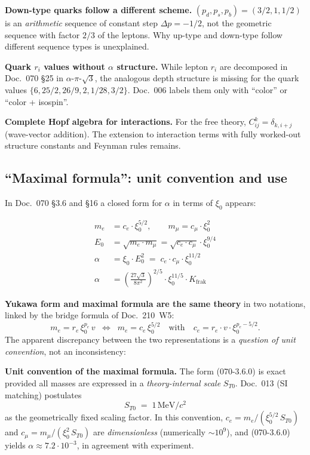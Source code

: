 \textbf{Down-type quarks follow a different scheme.}
$(p_d, p_s, p_b) = (3/2, 1, 1/2)$ is an \emph{arithmetic} sequence
of constant step $\Delta p = -1/2$, not the geometric sequence with
factor $2/3$ of the leptons. Why up-type and down-type follow
different sequence types is unexplained.

\textbf{Quark $r_i$ values without $\alpha$ structure.}
While lepton $r_i$ are decomposed in Doc.~070 §25 in
$\alpha$-$\pi$-$\sqrt{3}$, the analogous depth structure is missing
for the quark values $\{6, 25/2, 26/9, 2, 1/28, 3/2\}$. Doc.~006
labels them only with \enquote{color} or \enquote{color + isospin}.

\textbf{Complete Hopf algebra for interactions.}
For the free theory, $C^k_{ij} = \delta_{k,i+j}$ (wave-vector
addition). The extension to interaction terms with fully worked-out
structure constants and Feynman rules remains.

\subsection{\enquote{Maximal formula}: unit convention and use}
\label{subsec:warning-maximal-formula}

In Doc.~070 §3.6 and §16 a closed form for $\alpha$ in terms of $\xi_0$
appears:

\begin{align}
  m_e &= c_e \cdot \xi_0^{5/2}, \qquad m_\mu = c_\mu \cdot \xi_0^{2}
  \tag*{(070-4.2)}\\
  E_0 &= \sqrt{m_e \cdot m_\mu} = \sqrt{c_e \cdot c_\mu}\cdot \xi_0^{9/4}
  \tag*{(070-3)}\\
  \alpha &= \xi_0 \cdot E_0^2 \;=\; c_e \cdot c_\mu \cdot \xi_0^{11/2}
  \tag*{(070-3.6.0)}\\
  \alpha &= \left(\frac{27\sqrt{3}}{8\pi^2}\right)^{2/5}
           \cdot \xi_0^{11/5} \cdot K_{\text{frak}}
  \tag*{(070-3.6.1)}
\end{align}

\textbf{Yukawa form and maximal formula are the same theory} in two
notations, linked by the bridge formula of Doc.~210~W5:
\[
  m_e = r_e\,\xi_0^{p_e}\,v
  \;\;\Longleftrightarrow\;\;
  m_e = c_e\,\xi_0^{5/2}
  \quad\text{with}\quad
  c_e = r_e \cdot v \cdot \xi_0^{p_e - 5/2}.
\]
The apparent discrepancy between the two representations is a
\emph{question of unit convention}, not an inconsistency:

\textbf{Unit convention of the maximal formula.}
The form (070-3.6.0) is exact provided all masses are expressed in a
\emph{theory-internal scale} $S_{T0}$. Doc.~013 (SI matching) postulates
\begin{equation}
  S_{T0} \;=\; 1\,\text{MeV}/c^2
\end{equation}
as the geometrically fixed scaling factor. In this convention,
$c_e = m_e/(\xi_0^{5/2}\,S_{T0})$ and $c_\mu = m_\mu/(\xi_0^{2}\,S_{T0})$
are \emph{dimensionless} (numerically $\sim 10^9$), and (070-3.6.0)
yields $\alpha \approx 7.2\cdot 10^{-3}$, in agreement with experiment.

